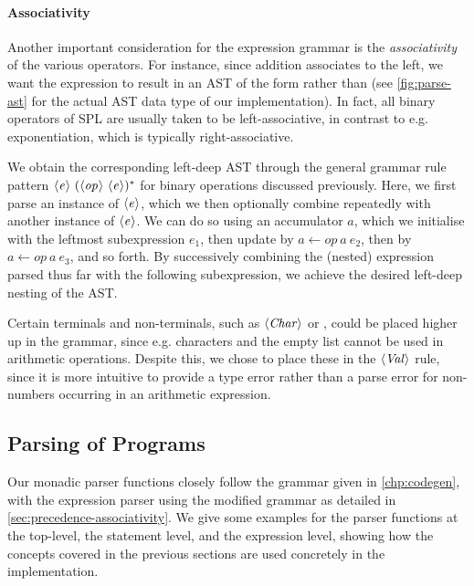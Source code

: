 \paragraph{Associativity}

Another important consideration for the expression grammar is the
\emph{associativity} of the various operators. For instance, since addition
associates to the left, we want the expression  to result in an AST
of the form  rather than  (see
\cref{fig:parse-ast} for the actual AST data type of our implementation).
In fact, all binary operators of SPL are usually taken to be left-associative,
in contrast to e.g. exponentiation, which is typically right-associative.

We obtain the corresponding left-deep AST through the general grammar rule
pattern $\NT{e}\ (\NT{op}\ \NT{e})^*$ for binary operations discussed previously.
Here, we first parse an instance of $\langle \textit{e}\kern.7pt \rangle$, which we then optionally combine
repeatedly with another instance of $\langle \textit{e}\kern.7pt \rangle$. We can do so using an
accumulator $a$, which we initialise with the leftmost subexpression
$e_1$, then update by $a \leftarrow \mathit{op}\ a\ e_2$, then by
$a \leftarrow \mathit{op}\ a\ e_3$, and so forth. By successively combining the (nested)
expression parsed thus far with the following subexpression, we achieve the
desired left-deep nesting of the AST.

Certain terminals and non-terminals, such as $\langle \textit{Char}\kern.7pt \rangle$ or \code{[]}, could be
placed higher up in the grammar, since e.g. characters and the empty list cannot
be used in arithmetic operations. Despite this, we chose to place these in the
$\langle \textit{Val}\kern.7pt \rangle$ rule, since it is more intuitive to provide a type error rather than
a parse error for non-numbers occurring in an arithmetic expression.


\subsection{Parsing of Programs} \label{sec:parsing-programs}

Our monadic parser functions closely follow the grammar given in
\cref{chp:codegen}, with the expression parser using the modified grammar as
detailed in \cref{sec:precedence-associativity}. We give some examples for the
parser functions at the top-level, the statement level, and the expression
level, showing how the concepts covered in the previous sections are used
concretely in the implementation.

